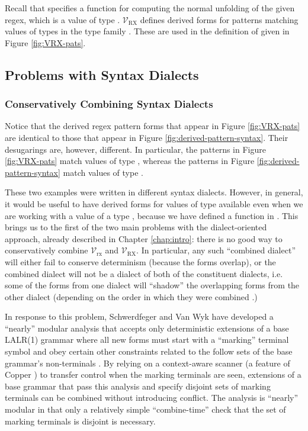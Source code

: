 {Recall that  specifies a function  for computing the normal unfolding of the given regex, which is a value of type . $\mathcal{V}_\text{RX}$ defines derived forms for patterns matching values of types in the type family . These are used in the definition of  given in Figure \ref{fig:VRX-pats}.




\subsection{Problems with Syntax Dialects}\label{sec:problems-with-syntax-dialects}
\subsubsection{Conservatively Combining Syntax Dialects}

Notice that the derived regex pattern forms that appear in Figure \ref{fig:VRX-pats} are identical to those that appear in Figure \ref{fig:derived-pattern-syntax}. Their desugarings are, however, different. In particular, the patterns in Figure \ref{fig:VRX-pats} match values of type , whereas the patterns in Figure \ref{fig:derived-pattern-syntax} match values of type . 

These two examples were written in different syntax dialects. However, in general, it would be useful to have derived forms for values of type  available even when we are working with a value of a type , because we have defined a function  in . This brings us to the first of the two main problems with the dialect-oriented approach, already described in Chapter \ref{chap:intro}: there is no good way to conservatively combine $\mathcal{V}_\text{rx}$ and $\mathcal{V}_\text{RX}$. In particular, any such ``combined dialect'' will either fail to conserve determinism (because the forms overlap), or the combined dialect will not be a dialect of both of the constituent dialects, i.e. some of the forms from one dialect will ``shadow'' the overlapping forms from the other dialect (depending on the order in which they were combined \cite{Ford04a}.) 

In response to this problem, Schwerdfeger and Van Wyk have developed a ``nearly'' modular analysis that accepts only deterministic extensions of a base LALR(1) grammar where all new forms must start with a ``marking'' terminal symbol and obey certain other constraints related to  the follow sets of the base grammar's non-terminals \cite{conf/pldi/SchwerdfegerW09}. By relying on a context-aware scanner (a feature of Copper \cite{conf/gpce/WykS07}) to transfer control when the marking terminals are seen, extensions of a base grammar that pass this analysis and specify disjoint sets of marking terminals can be combined without introducing conflict. The analysis is ``nearly'' modular in that only a relatively simple ``combine-time'' check that the set of marking terminals is disjoint is necessary.

}
